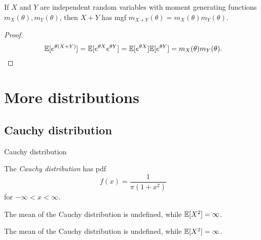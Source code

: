 %
\begin{note}
  \begin{field}
    \begin{thm}
      If $X$ and $Y$ are independent random variables with moment generating functions $m_X(\theta), m_Y(\theta)$, then $X + Y$ has mgf $m_{X + Y}(\theta) = m_X(\theta)m_Y(\theta)$.
    \end{thm}
  \end{field}
  \begin{field}
    \begin{proof}
      \[
        \mathbb{E}[e^{\theta(X + Y)}] = \mathbb{E}[e^{\theta X}e^{\theta Y}] = \mathbb{E}[e^{\theta X}]\mathbb{E}[e^{\theta Y}] = m_X(\theta)m_Y(\theta).\qedhere
      \]
    \end{proof}
  \end{field}
  \xplain{}%
\end{note}

\section{More distributions}

\subsection{Cauchy distribution}

%
\begin{note}
  \begin{field}
    Cauchy distribution
  \end{field}
  \begin{field}
    \begin{defi}
      The \emph{Cauchy distribution} has pdf
      \[
        f(x) = \frac{1}{\pi(1 + x^2)}
      \]
      for $-\infty < x < \infty$.
    \end{defi}
  \end{field}
  \xplain{}%
\end{note}

\begin{note}
  \begin{field}
    \begin{prop}
      The mean of the Cauchy distribution is undefined, while $\mathbb{E}[X^2] = \infty$.
    \end{prop}
  \end{field}
  \begin{field}
    \begin{prop}
      The mean of the Cauchy distribution is undefined, while $\mathbb{E}[X^2] = \infty$.
    \end{prop}
  \end{field}
  \xplain{}%
\end{note}

